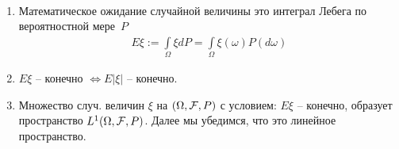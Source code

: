 \begin{remark}~
  \begin{enumerate}
    \item
      Математическое ожидание случайной величины это интеграл Лебега по вероятностной мере~$P$
      \begin{align*}
        E\xi := \int\limits_{\Omega} \xi dP = \int\limits_{\Omega} \xi(\omega) P(d\omega)
      \end{align*}

    \item
      $E\xi$ -- конечно $\iff E|\xi|$ -- конечно.

    \item
      Множество случ. величин $\xi$ на $(\Omega, \mathcal{F}, P)$ с условием: $E\xi$ -- конечно, образует
      пространство $L^1(\Omega, \mathcal{F}, P)$. Далее мы убедимся, что это линейное пространство.

  \end{enumerate}
\end{remark}



